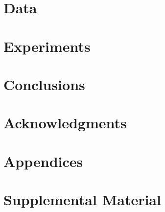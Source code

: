 \documentclass[11pt,a4paper]{article}
\begin{document}
\section{Data}

\section{Experiments}

\section{Conclusions}

\section*{Acknowledgments}




\appendix

\section{Appendices}
\label{sec:appendix}


\section{Supplemental Material}
\label{sec:supplemental}
\end{document}
